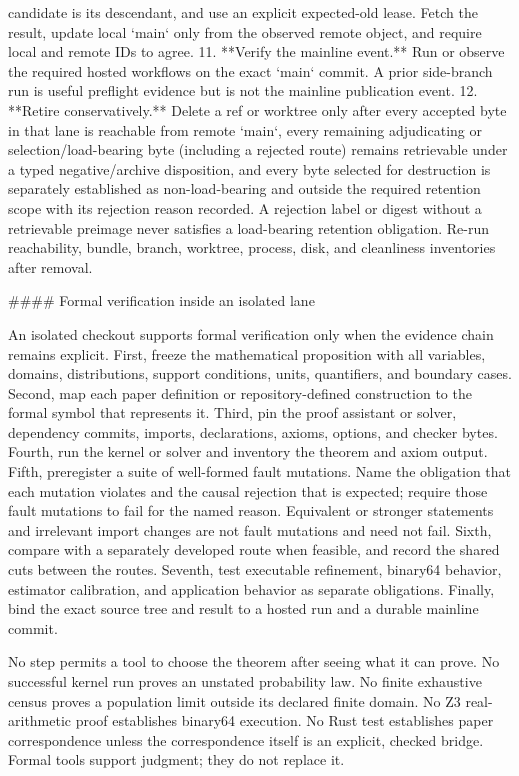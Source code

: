 \documentclass[11pt]{article}
\begin{document}
\begin{markdown}
    candidate is its descendant, and use an explicit expected-old lease. Fetch the result, update
    local `main` only from the observed remote object, and require local and remote IDs to agree.
11. **Verify the mainline event.** Run or observe the required hosted workflows on the exact
    `main` commit. A prior side-branch run is useful preflight evidence but is not the mainline
    publication event.
12. **Retire conservatively.** Delete a ref or worktree only after every accepted byte in that lane
    is reachable from remote `main`, every remaining adjudicating or selection/load-bearing byte
    (including a rejected route) remains retrievable under a typed negative/archive disposition,
    and every byte selected for destruction is separately established as non-load-bearing and
    outside the required retention scope with its rejection reason recorded. A rejection label or
    digest without a retrievable preimage never satisfies a load-bearing retention obligation.
    Re-run reachability, bundle, branch, worktree, process, disk, and cleanliness inventories after
    removal.

#### Formal verification inside an isolated lane

An isolated checkout supports formal verification only when the evidence chain remains explicit.
First, freeze the mathematical proposition with all variables, domains, distributions, support
conditions, units, quantifiers, and boundary cases. Second, map each paper definition or
repository-defined construction to the formal symbol that represents it. Third, pin the proof
assistant or solver, dependency commits, imports, declarations, axioms, options, and checker bytes.
Fourth, run the kernel or solver and inventory the theorem and axiom output. Fifth, preregister a
suite of well-formed fault mutations. Name the obligation that each mutation violates and the
causal rejection that is expected; require those fault mutations to fail for the named reason.
Equivalent or stronger statements and irrelevant import changes are not fault mutations and need
not fail. Sixth, compare with a separately developed route when feasible, and record the shared
cuts between the routes. Seventh, test executable refinement, binary64 behavior, estimator
calibration, and application behavior as separate obligations. Finally, bind the exact source tree
and result to a hosted run and a durable mainline commit.

No step permits a tool to choose the theorem after seeing what it can prove. No successful kernel
run proves an unstated probability law. No finite exhaustive census proves a population limit
outside its declared finite domain. No Z3 real-arithmetic proof establishes binary64 execution.
No Rust test establishes paper correspondence unless the correspondence itself is an explicit,
checked bridge. Formal tools support judgment; they do not replace it.


\end{markdown}
\end{document}
